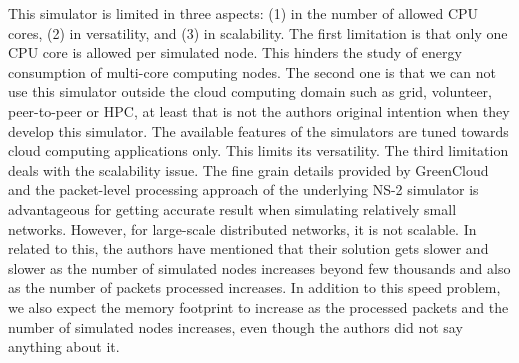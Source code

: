 This simulator is limited in three aspects: (1) in the number of allowed CPU cores, (2) in versatility, and (3) in scalability. The first limitation is that only one CPU core is allowed per simulated node. This hinders the study of energy consumption of multi-core computing nodes. The second one is that we can not use this simulator outside the cloud computing domain such as grid, volunteer, peer-to-peer or HPC, at least that is not the authors original intention when they develop this simulator. The available features of the simulators are tuned towards cloud computing applications only. This limits its versatility. The third limitation deals with the scalability issue. The fine grain details provided by GreenCloud and the packet-level processing approach of the underlying NS-2 simulator is advantageous for getting accurate result when simulating relatively small networks. However, for large-scale distributed networks, it is not scalable. In related to this, the authors have mentioned that their solution gets slower and slower as the number of simulated nodes increases beyond few thousands and also as the number of packets processed increases. In addition to this speed problem, we also expect the memory footprint to increase as the processed packets and the number of simulated nodes increases, even though the authors did not say anything about it.  
